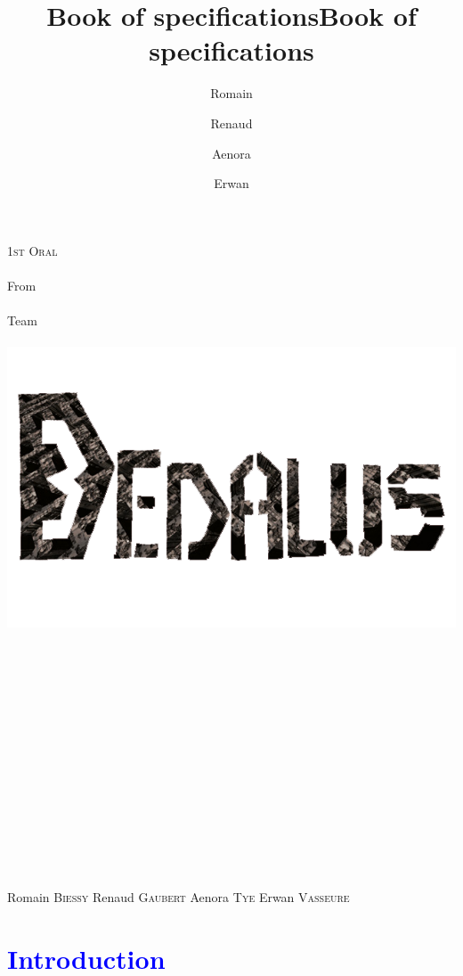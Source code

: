 \documentclass[article]{report} %
\title {Book of specifications}
\title {Book of specifications}
\author {Romain\and Renaud\and Aenora\and Erwan}
\date {}
\begin{document}
		\thispagestyle{empty}
  			\begin{titlepage} 
						\vspace*{1cm} 
  					\begin{center} 
  							{\huge{\textsc{1st Oral} \\ ~ \\{\large From}\\ ~\\ Team \\  ~ \\ }}
	  						\includegraphics[width = 14cm]{Images/Dedalus.png}
							\\ ~ \\ ~ \\ ~ \\ ~ \\ ~ \\ ~ \\ ~ \\ ~ \\ ~ \\ ~ \\ ~ \\ ~ \\ ~ \\ ~ 
						\end{center}
  					\hfill {\large Romain \textsc{Biessy}}
  					\hfill {\large Renaud \textsc{Gaubert}}
  					\hfill {\large Aenora \textsc{Tye}}
  					\hfill {\large Erwan  \textsc{Vasseure}}
  			\end{titlepage} 

  	\tableofcontents
  			\newpage
				\chapter{\textcolor{blue}{Introduction}}
\end{document}
